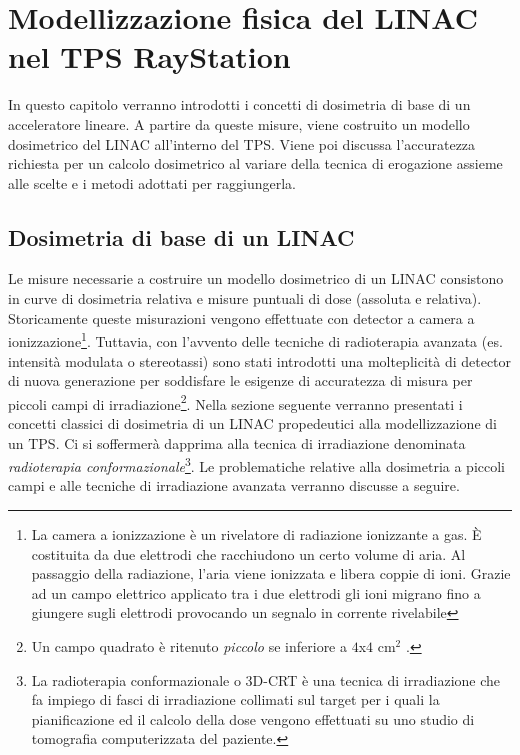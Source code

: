 \chapter{Modellizzazione f{}isica del LINAC nel TPS RayStation}
\minitoc
\textsf{In questo capitolo verranno introdotti i concetti di dosimetria di base di un acceleratore lineare. A partire da queste misure, viene costruito un modello dosimetrico del LINAC all'interno del TPS. Viene poi discussa l'accuratezza richiesta per un calcolo dosimetrico al variare della tecnica di erogazione assieme alle scelte e i metodi adottati per raggiungerla.}



\section{Dosimetria di base di un LINAC}
Le misure necessarie a costruire un modello dosimetrico di un LINAC consistono in curve di dosimetria relativa e misure puntuali di dose (assoluta e relativa).\\
Storicamente queste misurazioni vengono effettuate con detector a camera a ionizzazione\footnote{La camera a ionizzazione è un rivelatore di radiazione ionizzante a gas. \`E costituita da due elettrodi che racchiudono un certo volume di aria. Al passaggio della radiazione, l'aria viene ionizzata e libera coppie di ioni. Grazie ad un campo elettrico applicato tra i due elettrodi gli ioni migrano fino a giungere sugli elettrodi provocando un segnalo in corrente rivelabile}. Tuttavia, con l'avvento delle tecniche di radioterapia avanzata (es. intensità modulata o stereotassi) sono stati introdotti una molteplicità di detector di nuova generazione per soddisfare le esigenze di accuratezza di misura per piccoli campi di irradiazione\footnote{Un campo quadrato è ritenuto \textit{piccolo} se inferiore a $4$x$4$ cm$^2$ \cite{Das2008}.}. Nella sezione seguente verranno presentati i concetti classici di dosimetria di un LINAC propedeutici alla modellizzazione di un TPS. Ci si soffermerà dapprima alla tecnica di irradiazione denominata \textit{radioterapia conformazionale}\footnote{La radioterapia conformazionale o 3D-CRT è una tecnica di irradiazione che  fa impiego di fasci di irradiazione collimati sul target per i quali la pianificazione ed il calcolo della dose vengono effettuati su uno studio di tomografia computerizzata del paziente.}. Le problematiche relative alla dosimetria a piccoli campi e alle tecniche di irradiazione avanzata verranno discusse a seguire. 

